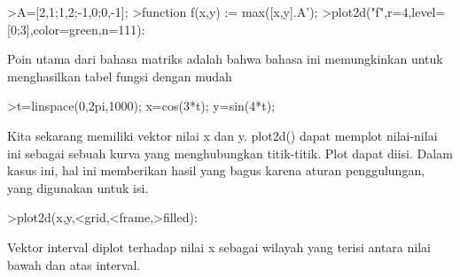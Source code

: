 \documentclass[12pt,arial,letterpaper]{book}
\begin{document}
\begin{eulercomment}
\begin{eulercomment}
\begin{eulercomment}
\begin{eulercomment}
\begin{eulercomment}
\begin{eulercomment}
\begin{eulercomment}
\begin{eulercomment}
\begin{eulercomment}
\begin{eulercomment}
\begin{eulercomment}
\begin{eulercomment}
\begin{eulercomment}
\begin{eulercomment}
\begin{eulercomment}
\begin{eulercomment}
\begin{eulerprompt}
>A=[2,1;1,2;-1,0;0,-1];
>function f(x,y) := max([x,y].A');
>plot2d("f",r=4,level=[0;3],color=green,n=111):
\end{eulerprompt}
\begin{eulercomment}
Poin utama dari bahasa matriks adalah bahwa bahasa ini memungkinkan
untuk menghasilkan tabel fungsi dengan mudah
\end{eulercomment}
\begin{eulerprompt}
>t=linspace(0,2pi,1000); x=cos(3*t); y=sin(4*t);
\end{eulerprompt}
\begin{eulercomment}
Kita sekarang memiliki vektor nilai x dan y. plot2d() dapat memplot
nilai-nilai ini sebagai sebuah kurva yang menghubungkan titik-titik.
Plot dapat diisi. Dalam kasus ini, hal ini memberikan hasil yang bagus
karena aturan penggulungan, yang digunakan untuk isi.
\end{eulercomment}
\begin{eulerprompt}
>plot2d(x,y,<grid,<frame,>filled):
\end{eulerprompt}
\begin{eulercomment}
Vektor interval diplot terhadap nilai x sebagai wilayah yang terisi
antara nilai bawah dan atas interval.


\end{eulercomment}
\end{eulercomment}
\end{eulercomment}
\end{eulercomment}
\end{eulercomment}
\end{eulercomment}
\end{eulercomment}
\end{eulercomment}
\end{eulercomment}
\end{eulercomment}
\end{eulercomment}
\end{eulercomment}
\end{eulercomment}
\end{eulercomment}
\end{eulercomment}
\end{eulercomment}
\end{eulercomment}
\end{document}
